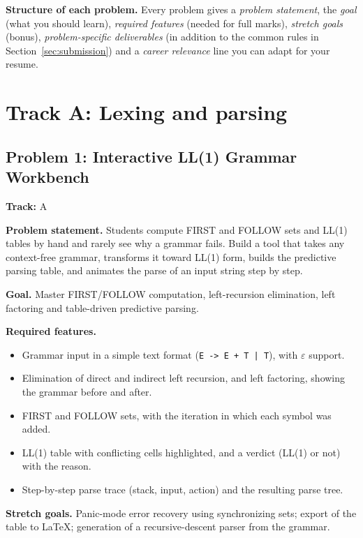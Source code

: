 \documentclass[11pt,a4paper]{article}
\newcommand{\fld}[1]{\par\smallskip\textbf{\color{accent}#1}\quad}
\newcommand{\meta}[1]{%
  \begin{tcolorbox}[colback=softbg,colframe=softbg,boxsep=2pt,left=4pt,right=4pt,top=2pt,bottom=2pt,arc=2pt]
  \small\textbf{Track:} #1
  \end{tcolorbox}}
\begin{document}
\textbf{Structure of each problem.} Every problem gives a \emph{problem statement}, the \emph{goal}
(what you should learn), \emph{required features} (needed for full marks), \emph{stretch goals}
(bonus), \emph{problem-specific deliverables} (in addition to the common rules in
Section~\ref{sec:submission}) and a \emph{career relevance} line you can adapt for your resume.

\section{Track A: Lexing and parsing}

\subsection{Problem 1: Interactive LL(1) Grammar Workbench}
\meta{A}

\fld{Problem statement.} Students compute FIRST and FOLLOW sets and LL(1) tables by hand and rarely
see why a grammar fails. Build a tool that takes any context-free grammar, transforms it toward LL(1)
form, builds the predictive parsing table, and animates the parse of an input string step by step.

\fld{Goal.} Master FIRST/FOLLOW computation, left-recursion elimination, left factoring and
table-driven predictive parsing.

\fld{Required features.}
\begin{itemize}
  \item Grammar input in a simple text format (\texttt{E -> E + T | T}), with $\varepsilon$ support.
  \item Elimination of direct and indirect left recursion, and left factoring, showing the grammar before and after.
  \item FIRST and FOLLOW sets, with the iteration in which each symbol was added.
  \item LL(1) table with conflicting cells highlighted, and a verdict (LL(1) or not) with the reason.
  \item Step-by-step parse trace (stack, input, action) and the resulting parse tree.
\end{itemize}

\fld{Stretch goals.} Panic-mode error recovery using synchronizing sets; export of the table to
\LaTeX; generation of a recursive-descent parser from the grammar.
\end{document}
